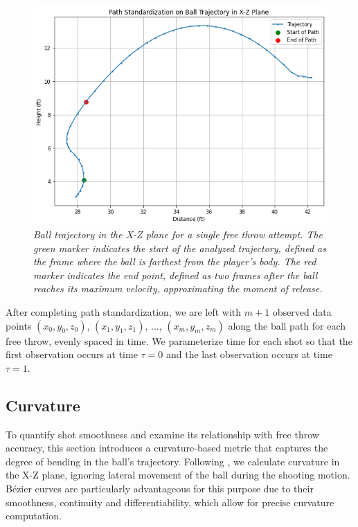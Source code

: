 \documentclass{article}
\begin{document}
      \begin{figure}[H]
        \centering
        \includegraphics[scale=0.4]{reports/arxiv/path_standardization.png}
        \caption{\it Ball trajectory in the X-Z plane for a single free throw attempt. The green marker indicates the start of the analyzed trajectory, defined as the frame where the ball is farthest from the player’s body. The red marker indicates the end point, defined as two frames after the ball reaches its maximum velocity, approximating the moment of release.}
        \label{fig:path-standardization}
      \end{figure}

      After completing path standardization, we are left with $m + 1$ observed data points \((x_0, y_0, z_0)\), \((x_1, y_1, z_1)\), ..., \((x_m, y_m, z_m)\) along the ball path for each free throw, evenly spaced in time. We parameterize time for each shot so that the first observation occurs at time $\tau = 0$ and the last observation occurs at time $\tau = 1$.

    \subsection{Curvature}
    \label{sec:curvature}
    
    To quantify shot smoothness and examine its relationship with free throw accuracy, this section introduces a curvature-based metric that captures the degree of bending in the ball's trajectory. Following \citet{slegers_role_2024}, we calculate curvature in the X-Z plane, ignoring lateral movement of the ball during the shooting motion. Bézier curves are particularly advantageous for this purpose due to their smoothness, continuity and differentiability, which allow for precise curvature computation. 
\end{document}

